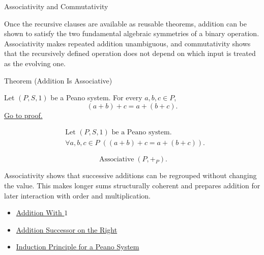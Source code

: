 \begin{topicbox}{Associativity and Commutativity}
\begin{exposition}
Once the recursive clauses are available as reusable theorems, addition can be
shown to satisfy the two fundamental algebraic symmetries of a binary
operation. Associativity makes repeated addition unambiguous, and
commutativity shows that the recursively defined operation does not depend on
which input is treated as the evolving one.
\end{exposition}

\begin{theorembox}{Theorem (Addition Is Associative)}
\begin{theorem}
\label{thm:addition-associative}
Let $(P,S,1)$ be a Peano system. For every $a,b,c \in P$,
\[
(a+b)+c=a+(b+c).
\]
\hyperref[prf:addition-associative]{Go to proof.}
\end{theorem}
\end{theorembox}

\begin{remark*}
\[
\begin{aligned}
&\text{Let } (P,S,1) \text{ be a Peano system.}\\
&\forall a,b,c \in P\;((a+b)+c=a+(b+c)).
\end{aligned}
\]
\end{remark*}

\begin{remark*}
\[
\operatorname{Associative}(P,+_P).
\]
\end{remark*}

\begin{remark*}[Interpretation]
Associativity shows that successive additions can be regrouped without
changing the value. This makes longer sums structurally coherent and prepares
addition for later interaction with order and multiplication.
\end{remark*}

\begin{dependencies}
\begin{itemize}
  \item \hyperref[thm:addition-with-one]{Addition With $1$}
  \item \hyperref[thm:addition-successor-on-right]{Addition Successor on the Right}
  \item \hyperref[thm:induction-principle-for-peano-system]{Induction Principle for a Peano System}
\end{itemize}
\end{dependencies}


\end{topicbox}
